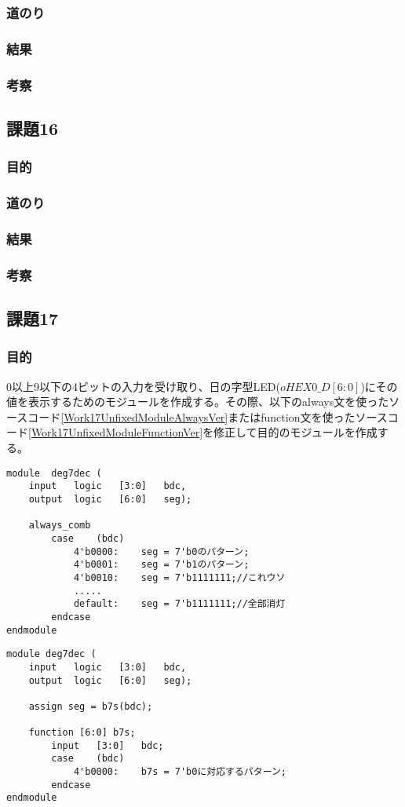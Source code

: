 \documentclass[a4paper]{jarticle}
\begin{document}
\subsubsection{道のり}
\subsubsection{結果}
\subsubsection{考察}
\subsection{課題16}
\subsubsection{目的}
\subsubsection{道のり}
\subsubsection{結果}
\subsubsection{考察}
\subsection{課題17}
\subsubsection{目的}
0以上9以下の4ビットの入力を受け取り、日の字型LED($oHEX0\_D\left[6:0\right]$)にその値を表示するためのモジュールを作成する。その際、以下のalways文を使ったソースコード\ref{Work17UnfixedModuleAlwaysVer}またはfunction文を使ったソースコード\ref{Work17UnfixedModuleFunctionVer}を修正して目的のモジュールを作成する。
\begin{lstlisting}[caption=always文版,label=Work17UnfixedModuleAlwaysVer]
module	deg7dec (
	input	logic	[3:0]	bdc,
	output	logic	[6:0]	seg);

	always_comb
		case	(bdc)
			4'b0000:	seg = 7'b0のパターン;
			4'b0001:	seg = 7'b1のパターン;
			4'b0010:	seg = 7'b1111111;//これウソ
			.....
			default:	seg = 7'b1111111;//全部消灯
		endcase
endmodule
\end{lstlisting}
\begin{lstlisting}[caption=function文版,label=Work17UnfixedModuleFunctionVer]
module deg7dec (
	input	logic	[3:0]	bdc,
	output	logic	[6:0]	seg);

	assign seg = b7s(bdc);

	function [6:0] b7s;
		input	[3:0]	bdc;
		case	(bdc)
			4'b0000:	b7s = 7'b0に対応するパターン;
		endcase
endmodule
\end{lstlisting}
\end{document}
